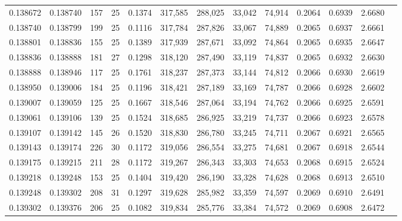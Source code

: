 \begin{tabular}{rrrrrrrrrrrrr}
0.138672 & 0.138740 & 157 &  25 &                                     0.1374 & 317,585 & 288,025 &  33,042 &  74,914 & 0.2064 & 0.6939 & 2.6680 \\
0.138740 & 0.138799 & 199 &  25 &                                     0.1116 & 317,784 & 287,826 &  33,067 &  74,889 & 0.2065 & 0.6937 & 2.6661 \\
0.138801 & 0.138836 & 155 &  25 &                                     0.1389 & 317,939 & 287,671 &  33,092 &  74,864 & 0.2065 & 0.6935 & 2.6647 \\
0.138836 & 0.138888 & 181 &  27 &                                     0.1298 & 318,120 & 287,490 &  33,119 &  74,837 & 0.2065 & 0.6932 & 2.6630 \\
0.138888 & 0.138946 & 117 &  25 &                                     0.1761 & 318,237 & 287,373 &  33,144 &  74,812 & 0.2066 & 0.6930 & 2.6619 \\
0.138950 & 0.139006 & 184 &  25 &                                     0.1196 & 318,421 & 287,189 &  33,169 &  74,787 & 0.2066 & 0.6928 & 2.6602 \\
0.139007 & 0.139059 & 125 &  25 &                                     0.1667 & 318,546 & 287,064 &  33,194 &  74,762 & 0.2066 & 0.6925 & 2.6591 \\
0.139061 & 0.139106 & 139 &  25 &                                     0.1524 & 318,685 & 286,925 &  33,219 &  74,737 & 0.2066 & 0.6923 & 2.6578 \\
0.139107 & 0.139142 & 145 &  26 &                                     0.1520 & 318,830 & 286,780 &  33,245 &  74,711 & 0.2067 & 0.6921 & 2.6565 \\
0.139143 & 0.139174 & 226 &  30 &                                     0.1172 & 319,056 & 286,554 &  33,275 &  74,681 & 0.2067 & 0.6918 & 2.6544 \\
0.139175 & 0.139215 & 211 &  28 &                                     0.1172 & 319,267 & 286,343 &  33,303 &  74,653 & 0.2068 & 0.6915 & 2.6524 \\
0.139218 & 0.139248 & 153 &  25 &                                     0.1404 & 319,420 & 286,190 &  33,328 &  74,628 & 0.2068 & 0.6913 & 2.6510 \\
0.139248 & 0.139302 & 208 &  31 &                                     0.1297 & 319,628 & 285,982 &  33,359 &  74,597 & 0.2069 & 0.6910 & 2.6491 \\
0.139302 & 0.139376 & 206 &  25 &                                     0.1082 & 319,834 & 285,776 &  33,384 &  74,572 & 0.2069 & 0.6908 & 2.6472 \\

\end{tabular}
